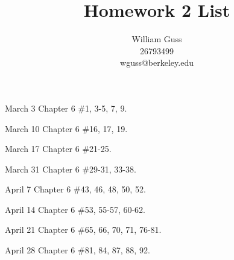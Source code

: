 \documentclass[letter]{article}
\title{Homework 2 List}
\author{William Guss\\26793499\\wguss@berkeley.edu}
\begin{document}
\maketitle
\thispagestyle{empty}


March 3    Chapter 6  \#1, 3-5, 7, 9.

March 10  Chapter 6  \#16, 17, 19.

March 17  Chapter 6  \#21-25.

March 31  Chapter 6  \#29-31, 33-38.

April 7  Chapter 6 \#43, 46, 48, 50, 52.

April 14  Chapter 6 \#53, 55-57, 60-62.

April 21  Chapter 6 \#65, 66, 70, 71, 76-81.

April 28  Chapter 6 \#81, 84, 87, 88, 92.

 

 
\end{document}
